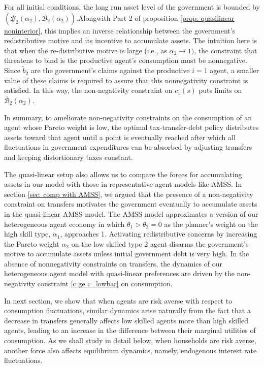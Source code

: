 \documentclass[thmsb,11pt]{article}
\begin{document}
{%
For all initial conditions, the long run asset level of the government is  bounded by $\left( \underline{\mathcal{B}}_{2}\left( \alpha
_{2}\right) ,\mathcal{\bar{\mathcal{B}}}_{2}\left( \alpha _{2}\right)
\right) $.Alongwith Part 2 of proposition \ref{prop: quasilinear noninterior}, this implies an inverse
 relationship between the government's redistributive motive  and its incentive to
accumulate assets. The intuition here is that when  the re-distributive
motive is large (i.e., as  $\alpha _{2}\rightarrow 1)$, the  constraint that threatens to bind
is the productive agent's consumption must be nonnegative. Since $\tilde{b}%
_{2}$ are the government's claims against the productive $i=1$ agent,  a smaller value of these
claims is required to assure that this nonnegativity constraint is satisfied. In this way, the non-negativity constraint on
$c_1(s)$  puts limits on $\bar{\mathcal{B}}_{2}(\alpha _{2})$.

In summary, to ameliorate non-negativity constraints on the consumption of an  agent whose Pareto weight is low, the optimal tax-transfer-debt policy  distributes assets  toward that agent  until a point is eventually  reached after which  all fluctuations in government expenditures can be absorbed by adjusting transfers and keeping distortionary taxes constant. 


 The quasi-linear setup also allows us to compare the forces for accumulating assets  in our model with those in
   representative agent models like AMSS. In section \ref{sec: comp with AMSS}, we argued that the presence of  a non-negativity constraint on transfers  motivates the government eventually to accumulate  assets in the  quasi-linear AMSS model.  The AMSS  model   approximates a version
   of our heterogeneous agent economy in which $\theta_1 > \theta_2 = 0$ as the planner's weight on the high skill type, $\alpha_1$, approaches 1.  Activating redistributive concerns by increasing the Pareto weight
 $\alpha_2$ on  the low skilled type 2 agent disarms the government's motive  to accumulate assets unless  initial government debt is very high.
 In the absence of nonnegativity  constraints on transfers, the dynamics of our heterogeneous agent model with quasi-linear preferences are driven by the non-negativity constraint \eqref{c ge c_lowbar} on consumption.

 In next section, we show that when agents are
risk averse with respect to consumption fluctuations, similar dynamics arise naturally from the fact that a decrease
in transfers generally affects low skilled agents more than high skilled
agents, leading to an increase in the difference between  their marginal utilities of
consumption. As we shall study in detail below,  when households are risk averse, another
force also affects  equilibrium dynamics, namely, endogenous interest rate fluctuations.

}
\end{document}
